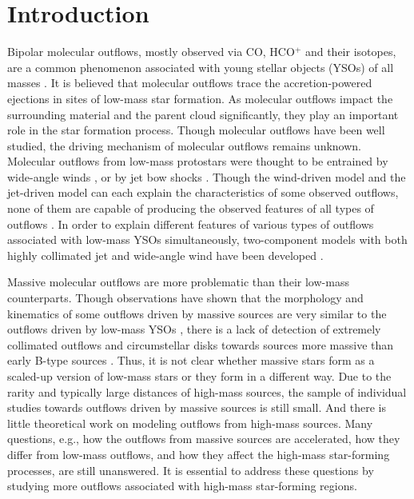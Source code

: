 \section{Introduction}
Bipolar molecular outflows, mostly observed via CO, HCO$^+$ and their isotopes, are a common phenomenon associated with young stellar objects (YSOs) of all masses \citep{2001ApJ...552L.167Z, 2002A&A...383..892B, 2004A&A...426..503W, 2005AJ....129..330W,  2015MNRAS.453..645M}. It is believed that molecular outflows trace the accretion-powered ejections in sites of low-mass star formation. As molecular outflows impact the surrounding material and the parent cloud significantly, they play an important role in the star formation process. Though molecular outflows have been well studied, the driving mechanism of molecular outflows remains unknown. Molecular outflows from low-mass protostars were thought to be entrained by wide-angle winds \citep{1991ApJ...370L..31S, 2001ApJ...557..429L}, or by jet bow shocks \citep{ 1993A&A...278..267R, 1993ApJ...414..230M, 2001ApJ...557..429L}. Though the wind-driven model and the jet-driven model can each explain the characteristics of some observed outflows, none of them are capable of producing the observed features of all types of outflows \citep{2000ApJ...542..925L, 2002ApJ...576..294L}. In order to explain different features of various types of outflows associated with low-mass YSOs simultaneously, two-component models with both highly collimated jet and wide-angle wind have been developed \citep{2000prpl.conf..789S, 2006ApJ...641..949B, 2006MNRAS.365.1131P, 2006ApJ...649..845S, 2007prpl.conf..277P, 2008ApJ...676.1088M}.

Massive molecular outflows are more problematic than their low-mass counterparts. Though observations have shown that the morphology and kinematics of some outflows driven by massive sources are very similar to the outflows driven by low-mass YSOs \citep[][]{1998ApJ...507..861S, 2002A&A...387..931B, 2009ApJ...696...66Q, 2011MNRAS.415L..49R}, there is a lack of detection of extremely collimated outflows and circumstellar disks towards sources more massive than early B-type sources \citep{2007prpl.conf..245A}. Thus, it is not clear whether massive stars form as a scaled-up version of low-mass stars or they form in a different way. Due to the rarity and typically large distances of high-mass sources, the sample of individual studies towards outflows driven by massive sources is still small. And there is little theoretical work on modeling outflows from high-mass sources. Many questions, e.g., how the outflows from massive sources are accelerated, how they differ from low-mass outflows, and how they affect the high-mass star-forming processes, are still unanswered. It is essential to address these questions by studying more outflows associated with high-mass star-forming regions. 

